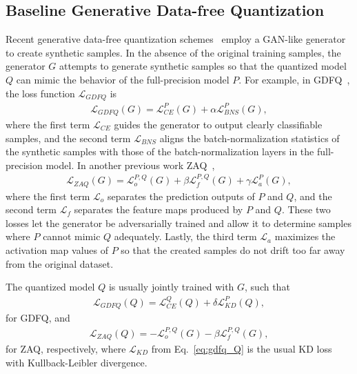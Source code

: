 \documentclass{article}
\newcommand{\JL}[1]{{\color{magenta}[\textbf{\sc JLee}: \textit{#1}]}}
\renewcommand{\JL}[1]{}
\newcommand{\loss}{\mathcal{L}}
\begin{document}
\subsection{Baseline Generative Data-free Quantization}
\JL{maybe we will remove zaq from here}
Recent generative data-free quantization schemes~\cite{gdfq,zaq} employ a GAN-like generator to create synthetic samples. 
In the absence of the original training samples, the generator $G$ attempts to generate synthetic samples so that the quantized model $Q$ can mimic the behavior of the full-precision model $P$.
For example, in GDFQ~\cite{gdfq}, the loss function $\loss_{GDFQ}$ is  
\begin{align}
    \loss_{GDFQ}(G) = \loss_{CE}^P(G) + \alpha\loss_{BNS}^P(G),
    \label{eq:gdfq}
\end{align}
where the first term $\loss_{CE}$ guides the generator to output clearly classifiable samples, and the second term $\loss_{BNS}$ aligns the batch-normalization statistics of the synthetic samples with those of the batch-normalization layers in the full-precision model.
In another previous work ZAQ~\cite{zaq},  
\begin{align}
    \loss_{ZAQ}(G) = \loss_{o}^{P,Q}(G) + \beta\loss_{f}^{P,Q}(G) + \gamma\loss_a^P(G),
    \label{eq:zaq}
\end{align}
where the first term $\loss_o$ separates the prediction outputs of $P$ and $Q$, and the second term $\loss_f$ separates the feature maps produced by $P$ and $Q$.
These two losses let the generator be adversarially trained and allow it to determine samples where $P$ cannot mimic $Q$ adequately.
Lastly, the third term $\loss_a$ maximizes the activation map values of $P$ so that the created samples do not drift too far away from the original dataset. 

The quantized model $Q$ is usually jointly trained with $G$, such that 
\begin{align}
    \loss_{GDFQ}(Q) = \loss_{CE}^Q(Q) + \delta\loss_{KD}^P(Q),
    \label{eq:gdfq_Q}
\end{align}
for GDFQ, and 
\begin{align}
    \loss_{ZAQ}(Q) = -\loss_{o}^{P,Q}(G) - \beta\loss_{f}^{P,Q}(G),
    \label{eq:zaq_Q}
\end{align}
for ZAQ, respectively, where $\loss_{KD}$ from Eq.~\ref{eq:gdfq_Q} is the usual KD loss with Kullback-Leibler divergence.
\end{document}
